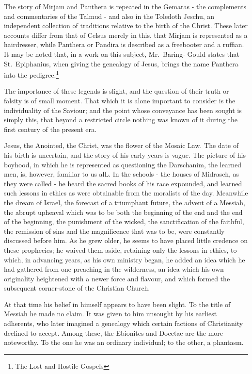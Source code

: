 \documentclass[]{book}
\let\rmarkdownfootnote\footnote%
\def\footnote{\protect\rmarkdownfootnote}
\begin{document}
The story of Mirjam and Panthera is repeated in the Gemaras - the
complements and commentaries of the Talmud - and also in the Toledoth
Jeschu, an independent collection of traditions relative to the birth of
the Christ. These later accounts differ from that of Celsus merely in
this, that Mirjam is represented as a hairdresser, while Panthera or
Pandira is described as a freebooter and a ruffian. It may be noted
that, in a work on this subject, Mr.~Baring- Gould states that
St.~Epiphanius, when giving the genealogy of Jesus, brings the name
Panthera into the pedigree.\footnote{The Lost and Hostile Gospels}

The importance of these legends is slight, and the question of their
truth or falsity is of small moment. That which it is alone important to
consider is the individuality of the Saviour; and the point whose
conveyance has been sought is simply this, that beyond a restricted
circle nothing was known of it during the first century of the present
era.

Jesus, the Anointed, the Christ, was the flower of the Mosaic Law. The
date of his birth is uncertain, and the story of his early years is
vague. The picture of his boyhood, in which he is represented as
questioning the Darschanim, the learned men, is, however, familiar to us
alL. In the schools - the houses of Midrasch, as they were called - he
heard the sacred books of his race expounded, and learned such lessons
in ethics as were obtainable from the moralists of the day. Meanwhile
the dream of Israel, the forecast of a triumphant future, the advent of
a Messiah, the abrupt upheaval which was to be both the beginning of the
end and the end of the beginning, the punishment of the wicked, the
sanctification of the faithful, the remission of sins and the
magnificence that was to be, were constantly discussed before him. As he
grew older, he seems to have placed little credence on these prophecies;
he waived them aside, retaining only the lessons in ethics, to which, in
advancing years, as his own ministry began, he added an idea which he
had gathered from one preaching in the wilderness, an idea which his own
originality heightened with a newer force and flavour, and which formed
the subsequent corner-stone of the Christian Church.

At that time his belief in himself appears to have been slight. To the
title of Messiah he made no claim. It was given to him unsought by his
earliest adherents, who later imagined a genealogy which certain
factions of Christianity declined to accept. Among these, the Ebionites
and Docetae are the more noteworthy. To the one he was an ordinary
individual; to the other, a phantasm.
\end{document}
